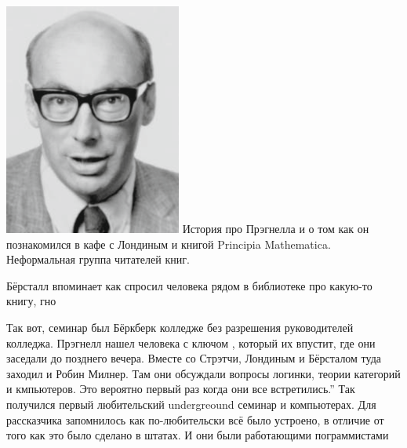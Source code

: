 \documentclass[14pt]{matmex-diploma-custom}
\begin{document}
\includegraphics[angle=0,scale=0.585]{220px-Peter_Landin.png}
История про Прэгнелла и о том как он познакомился в кафе с Лондиным и книгой Principia Mathematica. Неформальная группа читателей книг. 
\begin{framed}
Бёрсталл впоминает как спросил человека рядом в библиотеке про какую-то книгу, гно
\end{framed}

Так вот, семинар был Бёркберк колледже без разрешения руководителей колледжа. Прэгнелл нашел человека с ключом , который их впустит, где они заседали до позднего вечера. Вместе  со Стрэтчи, Лондиным и Бёрсталом туда заходил и Робин Милнер. Там они обсуждали вопросы логинки, теории категорий и кмпьютеров. Это вероятно первый раз когда они все встретились.” Так получился первый любительский undergreound семинар и компьютерах. Для рассказчика запомнилось как по-любительски всё было устроено, в отличие от того как это было сделано в штатах. И они были работающими пограммистами
\end{document}
